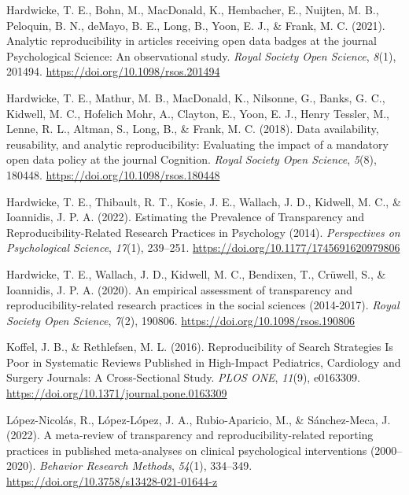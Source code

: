 \documentclass[
  ,apa7,floatsintext]{apa6}
\newlength{\cslhangindent}
\newlength{\cslentryspacingunit} %
\newenvironment{CSLReferences}[2] %
 {%
  \setlength{\parindent}{0pt}
  \ifodd #1
  \let\oldpar\par
  \def\par{\hangindent=\cslhangindent\oldpar}
  \fi
  \setlength{\parskip}{#2\cslentryspacingunit}
 }%
 {}
\begin{document}
\begin{CSLReferences}{1}{0}
\leavevmode{}%
Hardwicke, T. E., Bohn, M., MacDonald, K., Hembacher, E., Nuijten, M. B., Peloquin, B. N., deMayo, B. E., Long, B., Yoon, E. J., \& Frank, M. C. (2021). Analytic reproducibility in articles receiving open data badges at the journal {Psychological Science}: An observational study. \emph{Royal Society Open Science}, \emph{8}(1), 201494. \url{https://doi.org/10.1098/rsos.201494}

\leavevmode{}%
Hardwicke, T. E., Mathur, M. B., MacDonald, K., Nilsonne, G., Banks, G. C., Kidwell, M. C., Hofelich Mohr, A., Clayton, E., Yoon, E. J., Henry Tessler, M., Lenne, R. L., Altman, S., Long, B., \& Frank, M. C. (2018). Data availability, reusability, and analytic reproducibility: Evaluating the impact of a mandatory open data policy at the journal {Cognition}. \emph{Royal Society Open Science}, \emph{5}(8), 180448. \url{https://doi.org/10.1098/rsos.180448}

\leavevmode{}%
Hardwicke, T. E., Thibault, R. T., Kosie, J. E., Wallach, J. D., Kidwell, M. C., \& Ioannidis, J. P. A. (2022). Estimating the {Prevalence} of {Transparency} and {Reproducibility-Related Research Practices} in {Psychology} (2014). \emph{Perspectives on Psychological Science}, \emph{17}(1), 239--251. \url{https://doi.org/10.1177/1745691620979806}

\leavevmode{}%
Hardwicke, T. E., Wallach, J. D., Kidwell, M. C., Bendixen, T., Crüwell, S., \& Ioannidis, J. P. A. (2020). An empirical assessment of transparency and reproducibility-related research practices in the social sciences (2014-2017). \emph{Royal Society Open Science}, \emph{7}(2), 190806. \url{https://doi.org/10.1098/rsos.190806}

\leavevmode{}%
Koffel, J. B., \& Rethlefsen, M. L. (2016). Reproducibility of {Search} {Strategies} {Is} {Poor} in {Systematic} {Reviews} {Published} in {High}-{Impact} {Pediatrics}, {Cardiology} and {Surgery} {Journals}: {A} {Cross}-{Sectional} {Study}. \emph{PLOS ONE}, \emph{11}(9), e0163309. \url{https://doi.org/10.1371/journal.pone.0163309}

\leavevmode{}%
López-Nicolás, R., López-López, J. A., Rubio-Aparicio, M., \& Sánchez-Meca, J. (2022). A meta-review of transparency and reproducibility-related reporting practices in published meta-analyses on clinical psychological interventions (2000--2020). \emph{Behavior Research Methods}, \emph{54}(1), 334--349. \url{https://doi.org/10.3758/s13428-021-01644-z}


\end{CSLReferences}
\end{document}
